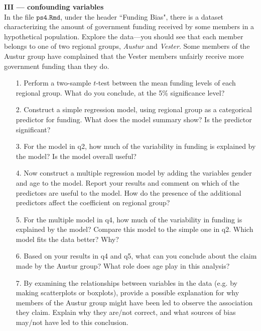 \documentclass[10pt]{extarticle}
\begin{document}
{\Large \bf III --- confounding variables}  \\

In the file $\texttt{ps4.Rmd}$, under the header ``Funding Bias", there is a dataset characterizing the amount of government funding received by some members in a hypothetical population. Explore the data---you should see that each member belongs to one of two regional groups, {\it Austur} and {\it Vester}. Some members of the Austur group have complained that the Vester members unfairly receive more government funding than they do. \\ 

\begin{itemize}

    \item[1.] Perform a two-sample $t$-test between the mean funding levels of each regional group. What do you conclude, at the 5\% significance level? \\ 
    
    \item[2.] Construct a simple regression model, using regional group as a categorical predictor for funding. What does the model summary show? Is the predictor significant? \\ 
    
    \item[3.] For the model in q2, how much of the variability in funding is explained by the model? Is the model overall useful?  \\ 
    
    \item[4.] Now construct a multiple regression model by adding the variables gender and age to the model. Report your results and comment on which of the predictors are useful to the model. How do the presence of the additional predictors affect the coefficient on regional group? \\ 
    
    \item[5.] For the multiple model in q4, how much of the variability in funding is explained by the model? Compare this model to the simple one in q2. Which model fits the data better? Why? \\ 
    
    \item[6.] Based on your results in q4 and q5, what can you conclude about the claim made by the Austur group? What role does age play in this analysis? \\ 
    
    \item[7.] By examining the relationships between variables in the data (e.g. by making scatterplots or boxplots), provide a possible explanation for why members of the Austur group might have been led to observe the association they claim. Explain why they are/not correct, and what sources of bias may/not have led to this conclusion. 
    
\end{itemize}
\end{document}
